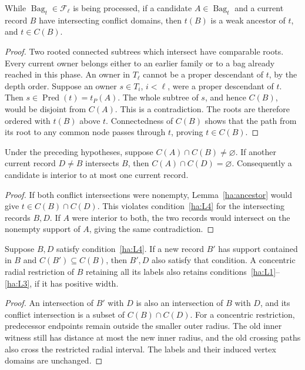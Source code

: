 \begin{lemma}\label{ha:ancestor}
While $\operatorname{Bag}_t\in\mathcal F_\ell$ is being processed,
if a candidate $A\in\operatorname{Bag}_t$ and a current record $B$
have intersecting conflict domains, then $t(B)$ is a weak ancestor of
$t$, and $t\in C(B)$.
\end{lemma}
\begin{proof}
Two rooted connected subtrees which intersect have comparable roots.
Every current owner belongs either to an earlier family or to a bag
already reached in this phase.  An owner in $T_\ell$ cannot be a
proper descendant of $t$, by the depth order.  Suppose an owner
$s\in T_i$, $i<\ell$, were a proper descendant of $t$.  Then
$s\in\operatorname{Pred}(t)=t_P(A)$.
The whole subtree of $s$, and hence $C(B)$, would be disjoint
from $C(A)$.  This is a contradiction.  The roots are therefore
ordered with $t(B)$ above $t$.  Connectedness of $C(B)$ shows that
the path from its root to any common node passes through $t$, proving
$t\in C(B)$.
\end{proof}

\begin{lemma}\label{ha:unique-interior}
Under the preceding hypotheses, suppose $C(A)\cap C(B)\ne\varnothing$.
If another current record $D\ne B$ intersects $B$, then
$C(A)\cap C(D)=\varnothing$.  Consequently a candidate is interior
to at most one current record.
\end{lemma}
\begin{proof}
If both conflict intersections were nonempty,
Lemma~\ref{ha:ancestor} would give $t\in C(B)\cap C(D)$.
This violates condition~\ref{ha:L4} for the intersecting records
$B,D$.  If $A$ were interior to both, the two records would
intersect on the nonempty support of $A$, giving the same contradiction.
\end{proof}

\begin{lemma}\label{ha:heredity}
Suppose $B,D$ satisfy condition~\ref{ha:L4}.  If a new record
$B'$ has support contained in $B$ and $C(B')\subseteq C(B)$,
then $B',D$ also satisfy that condition.  A concentric radial
restriction of $B$ retaining all its labels also retains
conditions~\ref{ha:L1}--\ref{ha:L3}, if it has positive width.
\end{lemma}
\begin{proof}
An intersection of $B'$ with $D$ is also an intersection of $B$
with $D$, and its conflict intersection is a subset of
$C(B)\cap C(D)$.  For a concentric restriction, predecessor
endpoints remain outside the smaller outer radius.  The old
inner witness still has distance at most the new inner radius,
and the old crossing paths also cross the restricted radial interval.
The labels and their induced vertex domains are unchanged.
\end{proof}

